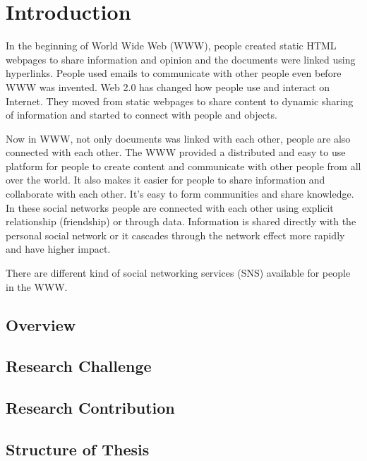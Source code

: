 

\chapter{Introduction} \label{Chapter:Introduction}

In the beginning of World Wide Web (WWW), people created static HTML webpages to share information and opinion and the documents were linked using hyperlinks. People used emails to communicate with other people even before WWW was invented. Web 2.0 has changed how people use and interact on Internet. They moved from static webpages to share content to dynamic sharing of information and started to connect with people and objects.

Now in WWW, not only documents was linked with each other, people are also connected with each other. The WWW provided a distributed and easy to use platform for people to create content and communicate with other people from all over the world. It also makes it easier for people to share information and collaborate with each other. It's easy to form communities and share knowledge. In these social networks people are connected with each other using explicit relationship (friendship) or through data. Information is shared directly with the personal social network or it cascades through the network effect more rapidly and have higher impact.

There are different kind of social networking services (SNS) available for people in the WWW. 




\section{Overview}
\section{Research Challenge}
\section{Research Contribution}
\section{Structure of Thesis}
 
